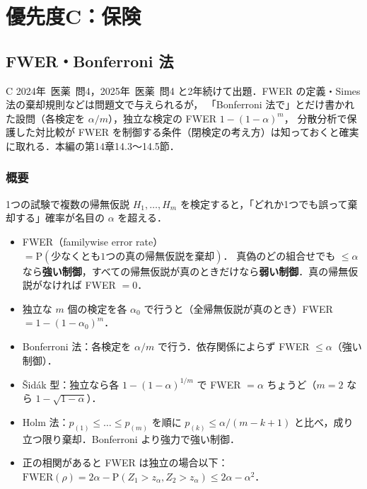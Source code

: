 \documentclass[a4paper,11pt,openany]{ltjsbook}
\newcommand{\kakomon}[2]{\mbox{#1年 医薬 問#2}}
\newcommand{\Prob}{\mathrm{P}}
\begin{document}
\part*{優先度C：保険}

\chapter{FWER・Bonferroni 法}\label{ch:m08}

\begin{priobox}{C}
\kakomon{2024}{4}，\kakomon{2025}{4} と2年続けて出題．FWER の定義・Simes 法の棄却規則などは問題文で与えられるが，
「Bonferroni 法で」とだけ書かれた設問（各検定を $\alpha/m$），独立な検定の FWER $1-(1-\alpha)^m$，
分散分析で保護した対比較が FWER を制御する条件（閉検定の考え方）は知っておくと確実に取れる．本編の第14章14.3〜14.5節．
\end{priobox}

\section{概要}\label{sec:m08-gaiyo}
1つの試験で複数の帰無仮説 $H_1,\dots,H_m$ を検定すると，「どれか1つでも誤って棄却する」確率が名目の $\alpha$ を超える．
\begin{pointbox}[覚える式]
\begin{itemize}
\item FWER（familywise error rate）$=\Prob(\text{少なくとも1つの真の帰無仮説を棄却})$．
      真偽のどの組合せでも $\le\alpha$ なら\textbf{強い制御}，すべての帰無仮説が真のときだけなら\textbf{弱い制御}．真の帰無仮説がなければ FWER $=0$．
\item 独立な $m$ 個の検定を各 $\alpha_0$ で行うと（全帰無仮説が真のとき）FWER $=1-(1-\alpha_0)^m$．
\item Bonferroni 法：各検定を $\alpha/m$ で行う．依存関係によらず FWER $\le\alpha$（強い制御）．
\item Šidák 型：独立なら各 $1-(1-\alpha)^{1/m}$ で FWER $=\alpha$ ちょうど（$m=2$ なら $1-\sqrt{1-\alpha}$）．
\item Holm 法：$p_{(1)}\le\dots\le p_{(m)}$ を順に $p_{(k)}\le\alpha/(m-k+1)$ と比べ，成り立つ限り棄却．Bonferroni より強力で強い制御．
\item 正の相関があると FWER は独立の場合以下：$\mathrm{FWER}(\rho)=2\alpha-\Prob(Z_1>z_\alpha,Z_2>z_\alpha)\le2\alpha-\alpha^2$．
\end{itemize}
\end{pointbox}
\end{document}
